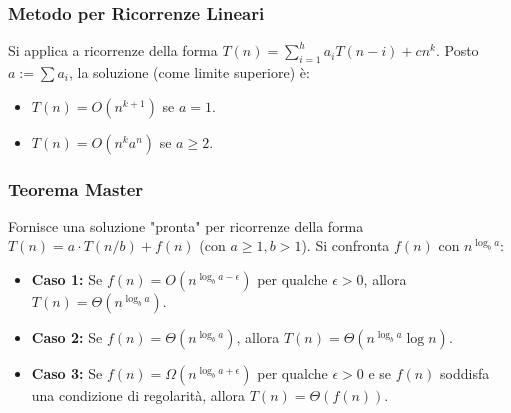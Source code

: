 \subsubsection{Metodo per Ricorrenze Lineari}
Si applica a ricorrenze della forma $T(n) = \sum_{i=1}^{h} a_i T(n-i) + cn^k$. Posto $a := \sum a_i$, la soluzione (come limite superiore) è:
\begin{itemize}
    \item $T(n) = O(n^{k+1})$ se $a=1$.
    \item $T(n) = O(n^k a^n)$ se $a \ge 2$.
\end{itemize}

\subsubsection{Teorema Master}
Fornisce una soluzione "pronta" per ricorrenze della forma $T(n) = a \cdot T(n/b) + f(n)$ (con $a \ge 1, b > 1$). Si confronta $f(n)$ con $n^{\log_b a}$:
\begin{itemize}
    \item \textbf{Caso 1:} Se $f(n) = O(n^{\log_b a - \epsilon})$ per qualche $\epsilon > 0$, allora $T(n) = \Theta(n^{\log_b a})$.
    \item \textbf{Caso 2:} Se $f(n) = \Theta(n^{\log_b a})$, allora $T(n) = \Theta(n^{\log_b a} \log n)$.
    \item \textbf{Caso 3:} Se $f(n) = \Omega(n^{\log_b a + \epsilon})$ per qualche $\epsilon > 0$ e se $f(n)$ soddisfa una condizione di regolarità, allora $T(n) = \Theta(f(n))$.
\end{itemize}